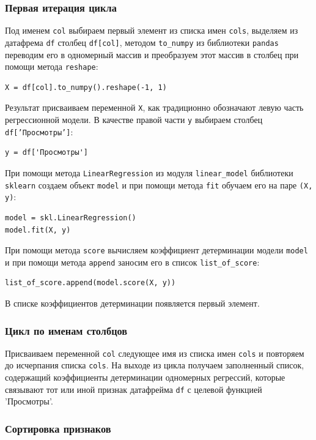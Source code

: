 \documentclass[a4paper,12pt]{article}
\begin{document}
\subsubsection{Первая итерация цикла}

Под именем \texttt{col} выбираем первый элемент из списка имен \texttt{cols}, выделяем из датафрема \texttt{df} столбец \texttt{df[col]}, методом \texttt{to\_numpy} из библиотеки \texttt{pandas} переводим его в одномерный массив и преобразуем этот массив в столбец при помощи метода \texttt{reshape}:
\begin{verbatim}
X = df[col].to_numpy().reshape(-1, 1)
\end{verbatim}
Результат присваиваем переменной \texttt{X}, как традиционно обозначают левую часть регрессионной модели. В качестве правой части \texttt{y} выбираем столбец \texttt{df['Просмотры']}:
\begin{verbatim}
y = df['Просмотры']
\end{verbatim}
При помощи метода \texttt{LinearRegression} из модуля \texttt{linear\_model} библиотеки \texttt{sklearn} создаем объект \texttt{model} и при помощи метода \texttt{fit} обучаем его на паре \texttt{(X, y)}:
\begin{verbatim}
model = skl.LinearRegression()
model.fit(X, y)
\end{verbatim}
При помощи метода \texttt{score} вычисляем коэффициент детерминации модели \texttt{model} и при помощи метода \texttt{append} заносим его в список \texttt{list\_of\_score}:
\begin{verbatim}
list_of_score.append(model.score(X, y))
\end{verbatim}
В списке коэффициентов детерминации появляется первый элемент.

\subsubsection{Цикл по именам столбцов}

Присваиваем переменной \texttt{col} следующее имя из списка имен \texttt{cols} и повторяем до исчерпания списка \texttt{cols}. На выходе из цикла получаем заполненный список, содержащий коэффициенты детерминации одномерных регрессий, которые связывают тот или иной признак датафрейма \texttt{df} с целевой функцией 'Просмотры'.


\subsubsection{Сортировка признаков}
\end{document}
